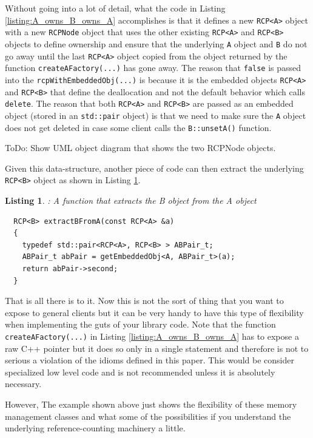 \documentclass[pdf,ps2pdf,11pt]{SANDreport}
\newtheorem{listing}{Listing}
\begin{document}
Without going into a lot of detail, what the code in Listing
{}\ref{listing:A_owns_B_owns_A} accomplishes is that it defines a new
{}\texttt{RCP<A>} object with a new {}\texttt{RCPNode} object that
uses the other existing {}\texttt{RCP<A>} and {}\texttt{RCP<B>}
objects to define ownership and ensure that the underlying
{}\texttt{A} object and {}\texttt{B} do not go away until the last
{}\texttt{RCP<A>} object copied from the object returned by the
function {}\texttt{createAFactory(...)} has gone away.  The reason
that {}\texttt{false} is passed into the
{}\texttt{rcpWithEmbeddedObj(...)} is because it is the embedded
objects {}\texttt{RCP<A>} and {}\texttt{RCP<B>} that define the
deallocation and not the default behavior which calls
{}\texttt{delete}.  The reason that both {}\texttt{RCP<A>} and
{}\texttt{RCP<B>} are passed as an embedded object (stored in an
{}\texttt{std::pair} object) is that we need to make sure the
{}\texttt{A} object does not get deleted in case some client calls the
{}\texttt{B::unsetA()} function.

ToDo: Show UML object diagram that shows the two RCPNode objects.

Given this data-structure, another piece of code can then extract the
underlying {}\texttt{RCP<B>} object as shown in Listing
{}\ref{listing:Extract_B_from_A}.

\begin{listing}: A function that extracts the B object from the A object \\
\label{listing:Extract_B_from_A}
{\small\begin{verbatim}
  RCP<B> extractBFromA(const RCP<A> &a)
  {
    typedef std::pair<RCP<A>, RCP<B> > ABPair_t;
    ABPair_t abPair = getEmbeddedObj<A, ABPair_t>(a);
    return abPair->second;
  }
\end{verbatim}}
\end{listing}

That is all there is to it.  Now this is not the sort of thing that
you want to expose to general clients but it can be very handy to have
this type of flexibility when implementing the guts of your library
code.  Note that the function {}\texttt{createAFactory(...)} in
Listing {}\ref{listing:A_owns_B_owns_A} has to expose a raw C++
pointer but it does so only in a single statement and therefore is not
to serious a violation of the idioms defined in this paper.  This
would be consider specialized low level code and is not recommended
unless it is absolutely necessary.

However, The example shown above just shows the flexibility of these
memory management classes and what some of the possibilities if you
understand the underlying reference-counting machinery a little.
\end{document}
